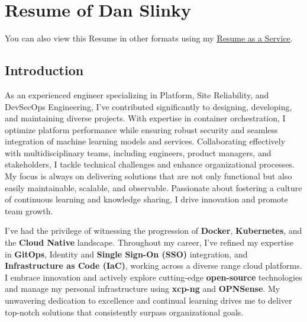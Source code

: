 \documentclass[
]{article}
\author{}
\date{}
\begin{document}
\hypertarget{simple-markdown-resume-of-dan-slinky-material-linkedin-simple-github-material-email}{%
\section{\texorpdfstring{\faMarkdown Resume of Dan Slinky
\href{https://linkedin.com/in/danslinky}{\faLinkedin}
\href{https://github.com/danslinky}{\faGithub}
\href{mailto:sysadmin@danslinky.co.uk}{\faEnvelope}}{ Resume of Dan Slinky   }}\label{simple-markdown-resume-of-dan-slinky-material-linkedin-simple-github-material-email}}

You can also view this Resume in other formats using my
\href{https://rtfm.danslinky.co.uk/resumes}{Resume as a Service}.

\hypertarget{fontawesome-solid-terminal-introduction}{%
\subsection{\texorpdfstring{\faTerminal
Introduction}{ Introduction}}\label{fontawesome-solid-terminal-introduction}}

As an experienced engineer specializing in Platform, Site Reliability,
and DevSecOps Engineering, I've contributed significantly to designing,
developing, and maintaining diverse projects. With expertise in
container orchestration, I optimize platform performance while ensuring
robust security and seamless integration of machine learning models and
services. Collaborating effectively with multidisciplinary teams,
including engineers, product managers, and stakeholders, I tackle
technical challenges and enhance organizational processes. My focus is
always on delivering solutions that are not only functional but also
easily maintainable, scalable, and observable. Passionate about
fostering a culture of continuous learning and knowledge sharing, I
drive innovation and promote team growth.

I've had the privilege of witnessing the progression of \faDocker
\textbf{Docker}, \faDharmachakra \textbf{Kubernetes}, and the
\textbf{Cloud Native} landscape. Throughout my career, I've refined my
expertise in \textbf{GitOps}, Identity and \textbf{Single Sign-On (SSO)}
integration, and \textbf{Infrastructure as Code (IaC)}, working across a
diverse range cloud platforms. I embrace innovation and actively explore
cutting-edge \textbf{open-source} technologies and manage my personal
infrastructure using \textbf{xcp-ng} and \textbf{OPNSense}. My
unwavering dedication to excellence and continual learning drives me to
deliver top-notch solutions that consistently surpass organizational
goals.
\end{document}
